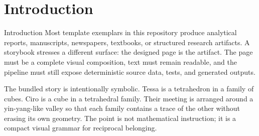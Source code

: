 \documentclass[
  ignorenonframetext,
]{beamer}
\author{\texorpdfstring{}{}}
\date{}
\begin{document}
\section{Introduction}\label{introduction}

\begin{frame}[allowframebreaks]{Introduction}
Most template exemplars in this repository produce analytical reports,
manuscripts, newspapers, textbooks, or structured research artifacts. A
storybook stresses a different surface: the designed page is the
artifact. The page must be a complete visual composition, text must
remain readable, and the pipeline must still expose deterministic source
data, tests, and generated outputs.

The bundled story is intentionally symbolic. Tessa is a tetrahedron in a
family of cubes. Ciro is a cube in a tetrahedral family. Their meeting
is arranged around a yin-yang-like valley so that each family contains a
trace of the other without erasing its own geometry. The point is not
mathematical instruction; it is a compact visual grammar for reciprocal
belonging.
\end{frame}
\end{document}

